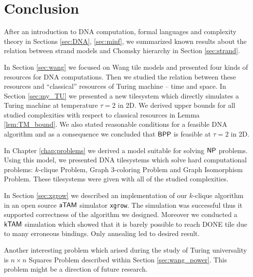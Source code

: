 \cleardoublepage{}   %
\chapter*{Conclusion}

After an introduction to DNA computation, formal languages and complexity theory in Sections \ref{sec:DNA}, \ref{sec:minf}, we summarized known results about the relation between strand models and Chomsky hierarchy in Section \ref{sec:strand}.

In Section \ref{sec:wang} we focused on Wang tile models and presented four kinds of resources for DNA computations. Then we studied the relation between these resources and ``classical'' resources of Turing machine -- time and space. In Section \ref{sec:my_TU} we presented a new tilesystem which directly simulates a Turing machine at temperature $\tau = 2$ in 2D. We derived upper bounds for all studied complexities with respect to classical resources in Lemma \ref{lem:TM_bound}. We also stated reasonable conditions for a feasible DNA algorithm and as a consequence we concluded that $\mathsf{BPP}$ is feasible at $\tau = 2$ in 2D.

In Chapter \ref{chap:problems} we derived a model suitable for solving $\mathsf{NP}$ problems. Using this model, we presented DNA tilesystems which solve hard computational problems: $k$-clique Problem, Graph 3-coloring Problem and Graph Isomorphism Problem. These tilesystems were given with all of the studied complexities.

In Section \ref{sec:xgrow} we described an implementation of our $k$-clique algorithm in an open source $\mathsf{aTAM}$ simulator {\tt xgrow}. The simulation was successful thus it supported correctness of the algorithm we designed. Moreover we conducted a $\mathsf{kTAM}$ simulation which showed that it is barely possible to reach DONE tile due to many erroneous bindings. Only annealing led to desired result.

Another interesting problem which arised during the study of Turing universality is $n\times n$ Squares Problem described within Section \ref{sec:wang_power}. This problem might be a direction of future research.

